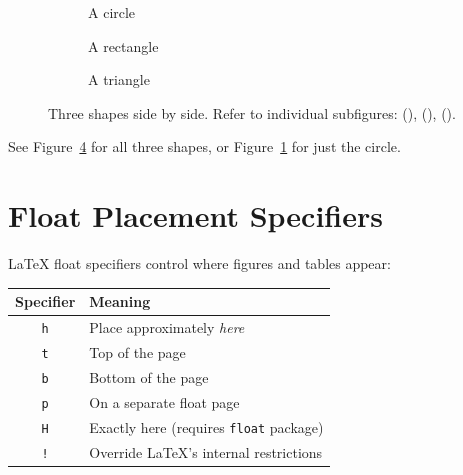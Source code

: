\documentclass[12pt]{article}
\begin{document}
\begin{figure}[ht]
\centering

\begin{subfigure}[b]{0.3\textwidth}
    \centering
    \caption{A circle}
    \label{fig:circle}
\end{subfigure}
\hfill
\begin{subfigure}[b]{0.3\textwidth}
    \centering
    \caption{A rectangle}
    \label{fig:rect}
\end{subfigure}
\hfill
\begin{subfigure}[b]{0.3\textwidth}
    \centering
    \caption{A triangle}
    \label{fig:tri}
\end{subfigure}

\caption{Three shapes side by side. Refer to individual subfigures:
    (), (), ().}
\label{fig:shapes}
\end{figure}

See Figure~\ref{fig:shapes} for all three shapes, or
Figure~\ref{fig:circle} for just the circle.

\section{Float Placement Specifiers}

LaTeX float specifiers control where figures and tables appear:

\begin{center}
\begin{tabular}{cl}
    \textbf{Specifier} & \textbf{Meaning} \\
    \hline
    \texttt{h} & Place approximately \emph{here} \\
    \texttt{t} & Top of the page \\
    \texttt{b} & Bottom of the page \\
    \texttt{p} & On a separate float page \\
    \texttt{H} & Exactly here (requires \texttt{float} package) \\
    \texttt{!} & Override LaTeX's internal restrictions \\
\end{tabular}
\end{center}
\end{document}
